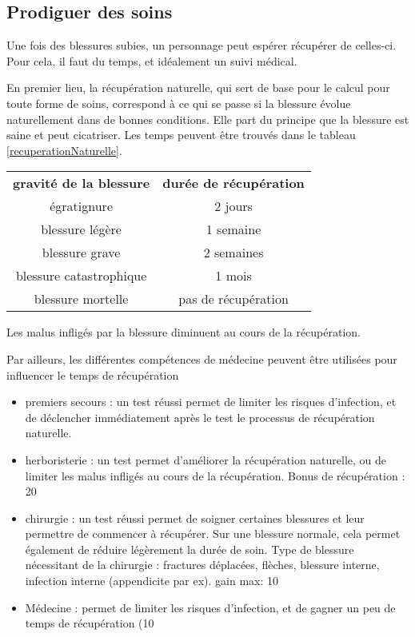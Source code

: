 \documentclass[10pt,a4paper,twocolumn]{book}
\begin{document}
\subsection{Prodiguer des soins}
Une fois des blessures subies, un personnage peut espérer récupérer de celles-ci. Pour cela, il faut du temps, et idéalement un suivi médical.

En premier lieu, la récupération naturelle, qui sert de base pour le calcul pour toute forme de soins, correspond à ce qui se passe si la blessure évolue naturellement dans de bonnes conditions. Elle part du principe que la blessure est saine et peut cicatriser. Les temps peuvent être trouvés dans le tableau \ref{recuperationNaturelle}.
\begin{table*}
\caption{Récupération naturelle}
\label{recuperationNaturelle}
\begin{center}
\begin{tabular}{cc}
\textbf{gravité de la blessure}&\textbf{durée de récupération}\\
égratignure & 2 jours\\
blessure légère& 1 semaine\\
blessure grave& 2 semaines\\
blessure catastrophique& 1 mois\\
blessure mortelle & pas de récupération
\end{tabular}
\end{center}
\end{table*}

Les malus infligés par la blessure diminuent au cours de la récupération.

Par ailleurs, les différentes compétences de médecine peuvent être utilisées pour influencer le temps de récupération 
\begin{itemize}
\item premiers secours : un test réussi permet de limiter les risques d'infection, et de déclencher immédiatement après le test le processus de récupération naturelle.
\item herboristerie : un test permet d'améliorer la récupération naturelle, ou de limiter les malus infligés au cours de la récupération. Bonus de récupération : 20%
\item chirurgie : un test réussi permet de soigner certaines blessures et leur permettre de commencer à récupérer. Sur une blessure normale, cela permet également de réduire légèrement la durée de soin. Type de blessure nécessitant de la chirurgie : fractures déplacées, flèches, blessure interne, infection interne (appendicite par ex). gain max: 10%
\item Médecine : permet de limiter les risques d'infection, et de gagner un peu de temps de récupération (10%
\end{itemize}
\end{document}
